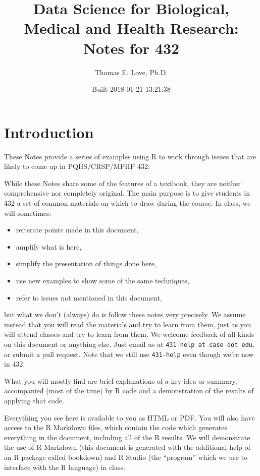 \documentclass[]{book}
\title{Data Science for Biological, Medical and Health Research: Notes for 432}
\author{Thomas E. Love, Ph.D.}
\date{Built 2018-01-21 13:21:38}
\providecommand{\tightlist}{%
  \setlength{\itemsep}{0pt}\setlength{\parskip}{0pt}}
\theoremstyle{definition}
\theoremstyle{definition}
\theoremstyle{definition}
\theoremstyle{remark}
\begin{document}
\maketitle

{
\setcounter{tocdepth}{1}
\tableofcontents
}
\chapter*{Introduction}\label{introduction}

These Notes provide a series of examples using R to work through issues
that are likely to come up in PQHS/CRSP/MPHP 432.

While these Notes share some of the features of a textbook, they are
neither comprehensive nor completely original. The main purpose is to
give students in 432 a set of common materials on which to draw during
the course. In class, we will sometimes:

\begin{itemize}
\tightlist
\item
  reiterate points made in this document,
\item
  amplify what is here,
\item
  simplify the presentation of things done here,
\item
  use new examples to show some of the same techniques,
\item
  refer to issues not mentioned in this document,
\end{itemize}

but what we don't (always) do is follow these notes very precisely. We
assume instead that you will read the materials and try to learn from
them, just as you will attend classes and try to learn from them. We
welcome feedback of all kinds on this document or anything else. Just
email us at \texttt{431-help\ at\ case\ dot\ edu}, or submit a pull
request. Note that we still use \texttt{431-help} even though we're now
in 432.

What you will mostly find are brief explanations of a key idea or
summary, accompanied (most of the time) by R code and a demonstration of
the results of applying that code.

Everything you see here is available to you as HTML or PDF. You will
also have access to the R Markdown files, which contain the code which
generates everything in the document, including all of the R results. We
will demonstrate the use of R Markdown (this document is generated with
the additional help of an R package called bookdown) and R Studio (the
``program'' which we use to interface with the R language) in class.
\end{document}
